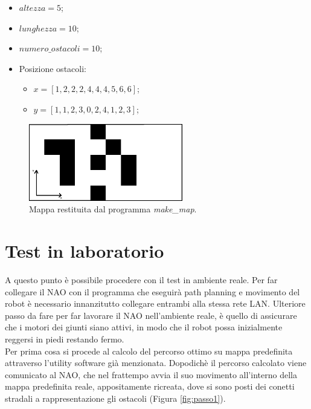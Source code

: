 \documentclass[english]{article}
\begin{document}
\begin{itemize}
\item $altezza = 5$;
\item $lunghezza = 10$;
\item $numero\_ostacoli = 10$;
\item Posizione ostacoli:
	\begin{itemize}
	\item $x = [1,2,2,2,4,4,4,5,6,6]$;
	\item $y = [1,1,2,3,0,2,4,1,2,3]$;
	\end{itemize}
\end{itemize}

\begin{figure}[!h]
\centering
\includegraphics[width=0.6\textwidth]{tappeto}
\caption{Mappa restituita dal programma \textit{make\_map}.}
\label{fig:tappeto}
\end{figure}



\section{Test in laboratorio}
A questo punto è possibile procedere con il test in ambiente reale. Per far collegare il NAO con il programma che eseguirà path planning e movimento del robot è necessario innanzitutto collegare entrambi alla stessa rete LAN. 
Ulteriore passo da fare per far lavorare il NAO nell'ambiente reale, è quello di assicurare che i motori dei giunti siano attivi, in modo che il robot possa inizialmente reggersi in piedi restando fermo. \\
Per prima cosa si procede al calcolo del percorso ottimo su mappa predefinita attraverso l'utility software già menzionata. Dopodichè il percorso calcolato viene comunicato al NAO, che nel frattempo avvia il suo movimento all'interno della mappa predefinita reale, appositamente ricreata, dove si sono posti dei conetti stradali a rappresentazione gli ostacoli (Figura \ref{fig:passo1}).
\end{document}
